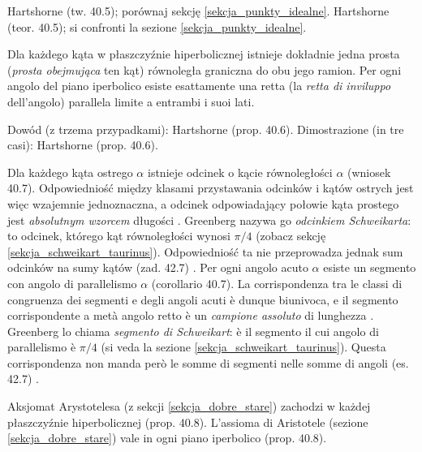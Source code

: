 Hartshorne \cite[s. 377--378]{hartshorne_2000} (tw. 40.5); porównaj sekcję \ref{sekcja_punkty_idealne}. %
Hartshorne \cite[p. 377--378]{hartshorne_2000} (teor. 40.5); si confronti la sezione \ref{sekcja_punkty_idealne}. %

\begin{proposition}
	Dla każdego kąta w płaszczyźnie hiperbolicznej istnieje dokładnie jedna prosta (\emph{prosta obejmująca} ten kąt) równoległa graniczna do obu jego ramion. %
	Per ogni angolo del piano iperbolico esiste esattamente una retta (la \emph{retta di inviluppo} dell'angolo) parallela limite a entrambi i suoi lati. %
\end{proposition}

Dowód (z trzema przypadkami): Hartshorne \cite[s. 378--380]{hartshorne_2000} (prop. 40.6). %
Dimostrazione (in tre casi): Hartshorne \cite[p. 378--380]{hartshorne_2000} (prop. 40.6). %

Dla każdego kąta ostrego $\alpha$ istnieje odcinek o kącie równoległości $\alpha$ (wniosek 40.7). %
Odpowiedniość między klasami przystawania odcinków i kątów ostrych jest więc wzajemnie jednoznaczna, a odcinek odpowiadający połowie kąta prostego jest \emph{absolutnym wzorcem} długości \cite[s. 380]{hartshorne_2000}. %
Greenberg \cite[s. 211]{greenberg_2010} nazywa go \emph{odcinkiem Schweikarta}: to odcinek, którego kąt równoległości wynosi $\pi/4$ (zobacz sekcję \ref{sekcja_schweikart_taurinus}). %
Odpowiedniość ta nie przeprowadza jednak sum odcinków na sumy kątów (zad. 42.7) \cite[s. 380]{hartshorne_2000}. %
Per ogni angolo acuto $\alpha$ esiste un segmento con angolo di parallelismo $\alpha$ (corollario 40.7). %
La corrispondenza tra le classi di congruenza dei segmenti e degli angoli acuti è dunque biunivoca, e il segmento corrispondente a metà angolo retto è un \emph{campione assoluto} di lunghezza \cite[p. 380]{hartshorne_2000}. %
Greenberg \cite[p. 211]{greenberg_2010} lo chiama \emph{segmento di Schweikart}: è il segmento il cui angolo di parallelismo è $\pi/4$ (si veda la sezione \ref{sekcja_schweikart_taurinus}). %
Questa corrispondenza non manda però le somme di segmenti nelle somme di angoli (es. 42.7) \cite[p. 380]{hartshorne_2000}. %

Aksjomat Arystotelesa (z sekcji \ref{sekcja_dobre_stare}) zachodzi w każdej płaszczyźnie hiperbolicznej \cite[s. 380--382]{hartshorne_2000} (prop. 40.8). %
L'assioma di Aristotele (sezione \ref{sekcja_dobre_stare}) vale in ogni piano iperbolico \cite[p. 380--382]{hartshorne_2000} (prop. 40.8). %

